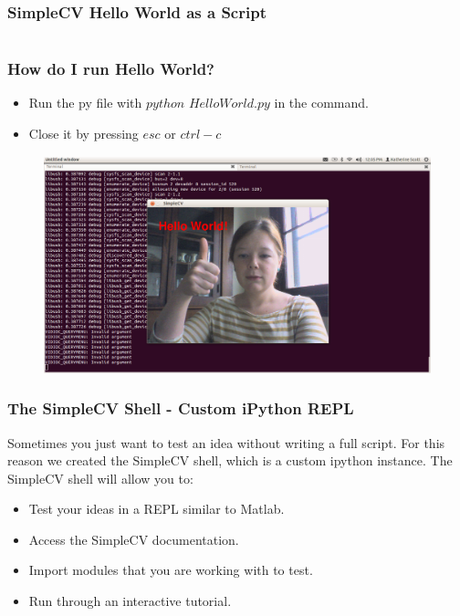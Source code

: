 \documentclass{beamer}
\begin{document}

\begin{frame}[fragile] %
\frametitle{SimpleCV Hello World as a Script}
\begin{example}[HelloWorld.py]
 \inputminted[linenos=true, tabsize=4,
 fontsize=\small]{python}{HelloWorld.py}
\end{example}
\end{frame}
\begin{frame}
\frametitle{How do I run Hello World?}
\begin{itemize}
\item Run the py file with $python$ $HelloWorld.py$ in the command.
\item Close it by pressing $esc$ or $ctrl-c$
\end{itemize}
\begin{figure}
  \includegraphics[width=0.9\linewidth]{HelloWorld1.png}
\end{figure}
\end{frame}

\begin{frame}
\frametitle{The SimpleCV Shell - Custom iPython REPL}
Sometimes you just want to test an idea without writing a full
script. For this reason we created the SimpleCV shell, which is a
custom ipython instance. The SimpleCV shell will allow you to:
\begin{itemize}
\item Test your ideas in a REPL similar to Matlab.
\item Access the SimpleCV documentation. 
\item Import modules that you are working with to test.
\item Run through an interactive tutorial. 
\end{itemize}
\end{frame}
\end{document}
